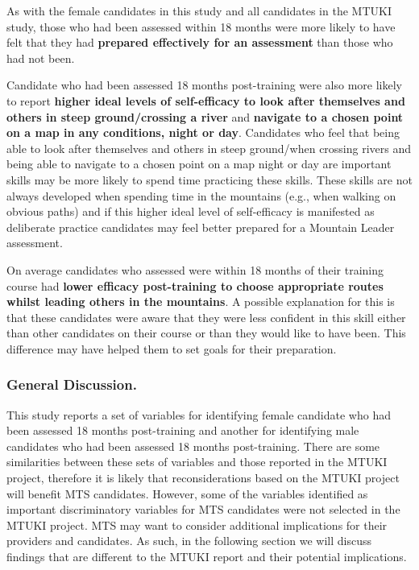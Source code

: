\documentclass[
  12pt,
  a4paper,
]{book}
\begin{document}
As with the female candidates in this study and all candidates in the MTUKI study, those who had been assessed within 18 months were more likely to have felt that they had \textbf{prepared effectively for an assessment} than those who had not been.

Candidate who had been assessed 18 months post-training were also more likely to report \textbf{higher ideal levels of self-efficacy to look after themselves and others in steep ground/crossing a river} and \textbf{navigate to a chosen point on a map in any conditions, night or day}. Candidates who feel that being able to look after themselves and others in steep ground/when crossing rivers and being able to navigate to a chosen point on a map night or day are important skills may be more likely to spend time practicing these skills. These skills are not always developed when spending time in the mountains (e.g., when walking on obvious paths) and if this higher ideal level of self-efficacy is manifested as deliberate practice candidates may feel better prepared for a Mountain Leader assessment.

On average candidates who assessed were within 18 months of their training course had \textbf{lower efficacy post-training to choose appropriate routes whilst leading others in the mountains}. A possible explanation for this is that these candidates were aware that they were less confident in this skill either than other candidates on their course or than they would like to have been. This difference may have helped them to set goals for their preparation.

\hypertarget{mts-part-b-general-discussion}{%
\subsubsection{General Discussion.}\label{mts-part-b-general-discussion}}

This study reports a set of variables for identifying female candidate who had been assessed 18 months post-training and another for identifying male candidates who had been assessed 18 months post-training. There are some similarities between these sets of variables and those reported in the MTUKI project, therefore it is likely that reconsiderations based on the MTUKI project will benefit MTS candidates. However, some of the variables identified as important discriminatory variables for MTS candidates were not selected in the MTUKI project. MTS may want to consider additional implications for their providers and candidates. As such, in the following section we will discuss findings that are different to the MTUKI report and their potential implications.
\end{document}
